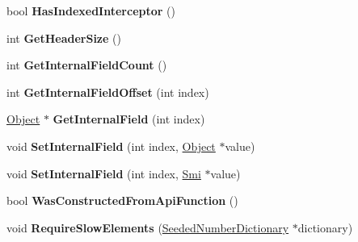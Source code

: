 \begin{DoxyCompactItemize}
\item 
bool {\bfseries Has\+Indexed\+Interceptor} ()\hypertarget{classv8_1_1internal_1_1_j_s_object_a21b64937063c2e27ea362cb38cf50980}{}\label{classv8_1_1internal_1_1_j_s_object_a21b64937063c2e27ea362cb38cf50980}

\item 
int {\bfseries Get\+Header\+Size} ()\hypertarget{classv8_1_1internal_1_1_j_s_object_ab5c9687d52aada4fafd5ccb38f9f3770}{}\label{classv8_1_1internal_1_1_j_s_object_ab5c9687d52aada4fafd5ccb38f9f3770}

\item 
int {\bfseries Get\+Internal\+Field\+Count} ()\hypertarget{classv8_1_1internal_1_1_j_s_object_a95f7f29627e97c31b63a1942ad6c6a18}{}\label{classv8_1_1internal_1_1_j_s_object_a95f7f29627e97c31b63a1942ad6c6a18}

\item 
int {\bfseries Get\+Internal\+Field\+Offset} (int index)\hypertarget{classv8_1_1internal_1_1_j_s_object_acfeeb19a5a6d83442b186ae22977dc44}{}\label{classv8_1_1internal_1_1_j_s_object_acfeeb19a5a6d83442b186ae22977dc44}

\item 
\hyperlink{classv8_1_1internal_1_1_object}{Object} $\ast$ {\bfseries Get\+Internal\+Field} (int index)\hypertarget{classv8_1_1internal_1_1_j_s_object_aa2f48f9339b6ffda374a20c712c11d21}{}\label{classv8_1_1internal_1_1_j_s_object_aa2f48f9339b6ffda374a20c712c11d21}

\item 
void {\bfseries Set\+Internal\+Field} (int index, \hyperlink{classv8_1_1internal_1_1_object}{Object} $\ast$value)\hypertarget{classv8_1_1internal_1_1_j_s_object_a6ef9447688a792e1bba0b22a5ea490f9}{}\label{classv8_1_1internal_1_1_j_s_object_a6ef9447688a792e1bba0b22a5ea490f9}

\item 
void {\bfseries Set\+Internal\+Field} (int index, \hyperlink{classv8_1_1internal_1_1_smi}{Smi} $\ast$value)\hypertarget{classv8_1_1internal_1_1_j_s_object_a0b3a575eaf15ca7641d144838e5c4816}{}\label{classv8_1_1internal_1_1_j_s_object_a0b3a575eaf15ca7641d144838e5c4816}

\item 
bool {\bfseries Was\+Constructed\+From\+Api\+Function} ()\hypertarget{classv8_1_1internal_1_1_j_s_object_a103c33edb452a70d53806cb0013dfb6c}{}\label{classv8_1_1internal_1_1_j_s_object_a103c33edb452a70d53806cb0013dfb6c}

\item 
void {\bfseries Require\+Slow\+Elements} (\hyperlink{classv8_1_1internal_1_1_seeded_number_dictionary}{Seeded\+Number\+Dictionary} $\ast$dictionary)\hypertarget{classv8_1_1internal_1_1_j_s_object_a5ba62572da09a08e035b0b308d073b6a}{}\label{classv8_1_1internal_1_1_j_s_object_a5ba62572da09a08e035b0b308d073b6a}


\end{DoxyCompactItemize}
